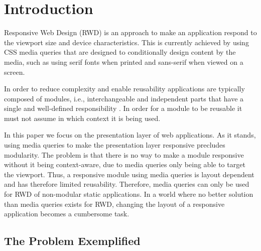 \documentclass{acm_proc_article-sp}
\begin{document}
\section{Introduction}

  Responsive Web Design (RWD) is an approach to make an application respond to the viewport size and device characteristics.
  This is currently achieved by using CSS media queries that are designed to conditionally design content by the media, such as using serif fonts when printed and sans-serif when viewed on a screen.

  In order to reduce complexity and enable reusability applications are typically composed of modules, i.e., interchangeable and independent parts that have a single and well-defined responsibility \cite{parnas1972criteria}.
  In order for a module to be reusable it must not assume in which context it is being used.

  In this paper we focus on the presentation layer of web applications.
  As it stands, using media queries to make the presentation layer responsive precludes modularity.
  The problem is that there is no way to make a module responsive without it being context-aware, due to media queries only being able to target the viewport.
  Thus, a responsive module using media queries is layout dependent and has therefore limited reusability.
  Therefore, media queries can only be used for RWD of non-modular static applications.
  In a world where no better solution than media queries exists for RWD, changing the layout of a responsive application becomes a cumbersome task.

  \subsection{The Problem Exemplified}
    
\end{document}
